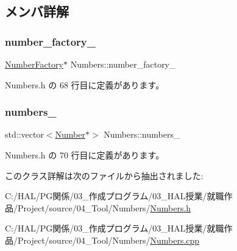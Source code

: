 \subsection{メンバ詳解}
\mbox{\label{class_numbers_af9e8fa1658caf4beddfb6f450d8dc053}} 
\subsubsection{\texorpdfstring{number\+\_\+factory\+\_\+}{number\_factory\_}}
{\footnotesize\ttfamily \mbox{\hyperlink{class_number_factory}{Number\+Factory}}$\ast$ Numbers\+::number\+\_\+factory\+\_\+\hspace{0.3cm}{\ttfamily [private]}}



 Numbers.\+h の 68 行目に定義があります。

\mbox{\label{class_numbers_ab0649eccc71117670e5dc1ecc4cbe2a2}} 
\subsubsection{\texorpdfstring{numbers\+\_\+}{numbers\_}}
{\footnotesize\ttfamily std\+::vector$<$\mbox{\hyperlink{class_number}{Number}}$\ast$$>$ Numbers\+::numbers\+\_\+\hspace{0.3cm}{\ttfamily [private]}}



 Numbers.\+h の 70 行目に定義があります。



このクラス詳解は次のファイルから抽出されました\+:\begin{DoxyCompactItemize}
\item 
C\+:/\+H\+A\+L/\+P\+G関係/03\+\_\+作成プログラム/03\+\_\+\+H\+A\+L授業/就職作品/\+Project/source/04\+\_\+\+Tool/\+Numbers/\mbox{\hyperlink{_numbers_8h}{Numbers.\+h}}\item 
C\+:/\+H\+A\+L/\+P\+G関係/03\+\_\+作成プログラム/03\+\_\+\+H\+A\+L授業/就職作品/\+Project/source/04\+\_\+\+Tool/\+Numbers/\mbox{\hyperlink{_numbers_8cpp}{Numbers.\+cpp}}\end{DoxyCompactItemize}
